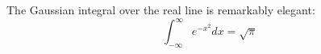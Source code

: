 \documentclass{article}
\begin{document}
The Gaussian integral over the real line is remarkably elegant:
\begin{equation}
\int_{-\infty}^\infty e^{-x^2} dx = \sqrt{\pi}
\end{equation}
\end{document}
